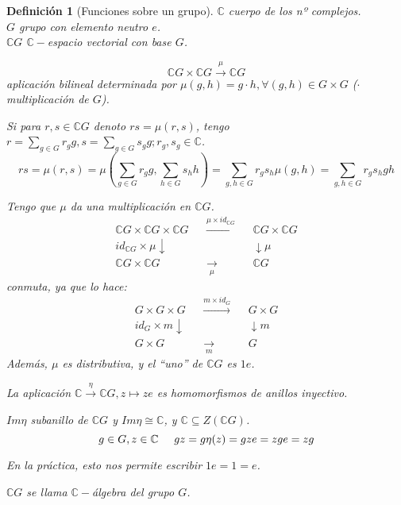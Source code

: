 \documentclass[11pt,a4paper]{article}
\theoremstyle{break}
\newtheorem{definition}[theorem]{Definición}
\begin{document}
\begin{definition}[Funciones sobre un grupo]
$\mathbb{C}$ cuerpo de los nº complejos. \\
$G$ grupo con elemento neutro $e$. \\
$\mathbb{C}G$ $\mathbb{C}-$espacio vectorial con base $G$.

$$\mathbb{C}G \times \mathbb{C}G \overset{\mu}{\to} \mathbb{C}G$$
aplicación bilineal determinada por $\mu(g, h) = g \cdot h, \forall (g, h) \in G \times G$ ($\cdot$ multiplicación de $G$).

Si para $r, s \in \mathbb{C}G$ denoto $rs = \mu(r, s)$, tengo $r = \sum\limits_{g \in G} r_{g}g, s = \sum\limits_{g \in G} s_{g}g; r_{g}, s_{g} \in \mathbb{C}$.
$$rs = \mu(r, s) = \mu(\sum_{g \in G}r_{g}g, \sum_{h \in G} s_{h}h) = \sum_{g, h \in G} r_{g}s_{h} \mu(g, h) = \sum_{g, h \in G} r_{g}s_{h}gh$$

Tengo que $\mu$ da una multiplicación en $\mathbb{C}G$.
$$\begin{aligned}
\mathbb{C}G \times \mathbb{C}G \times \mathbb{C}G & & \overset{\mu \times id_{\mathbb{C}G}}{\longrightarrow} & & \mathbb{C}G \times \mathbb{C}G \\
id_{\mathbb{C}G} \times \mu \downarrow & & & & \downarrow \mu \\
\mathbb{C}G \times \mathbb{C}G & & \underset{\mu}{\longrightarrow} & & \mathbb{C}G
\end{aligned}$$
conmuta, ya que lo hace:
$$\begin{aligned}
G \times G \times G & & \overset{m \times id_{G}}{\longrightarrow} & & G \times G \\
id_{G} \times m \downarrow & & & & \downarrow m \\
G \times G & & \underset{m}{\longrightarrow} & & G
\end{aligned}$$
Además, $\mu$ es distributiva, y el ``uno'' de $\mathbb{C}G$ es $1e$.

La aplicación $\mathbb{C} \overset{\eta}{\to} \mathbb{C}G, z \mapsto ze$ es homomorfismos de anillos inyectivo.

$Im \eta$ subanillo de $\mathbb{C}G$ y $Im \eta \cong \mathbb{C}$, y $\mathbb{C} \subseteq Z(\mathbb{C}G)$.
$$g \in G, z \in \mathbb{C} \hspace{0.5cm} gz = g \eta(z) = gze = zge = zg$$

En la práctica, esto nos permite escribir $1e = 1 = e$.

$\mathbb{C}G$ se llama $\mathbb{C}-$álgebra del grupo $G$.


\end{definition}
\end{document}
